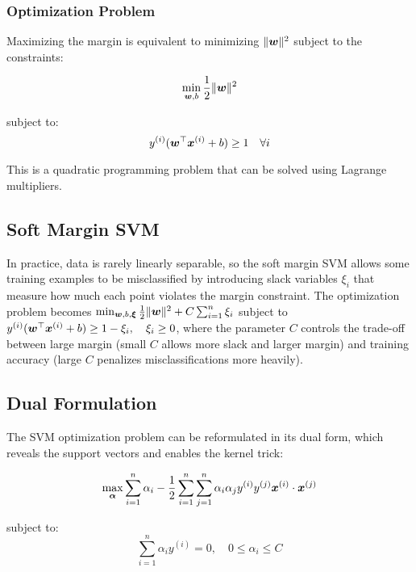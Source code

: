 \subsubsection{Optimization Problem}

Maximizing the margin is equivalent to minimizing $\|\boldsymbol{w}\|^2$ subject to the constraints:

\begin{equation}
\min_{\boldsymbol{w}, b} \frac{1}{2}\|\boldsymbol{w}\|^2
\end{equation}

subject to:
\begin{equation}
y^{(i)}(\boldsymbol{w}^\top \boldsymbol{x}^{(i)} + b) \geq 1 \quad \forall i
\end{equation}

This is a quadratic programming problem that can be solved using Lagrange multipliers.

\subsection{Soft Margin SVM}

In practice, data is rarely linearly separable, so the soft margin SVM allows some training examples to be misclassified by introducing slack variables $\xi_i$ that measure how much each point violates the margin constraint. The optimization problem becomes $\min_{\boldsymbol{w}, b, \boldsymbol{\xi}} \frac{1}{2}\|\boldsymbol{w}\|^2 + C \sum_{i=1}^{n} \xi_i$ subject to $y^{(i)}(\boldsymbol{w}^\top \boldsymbol{x}^{(i)} + b) \geq 1 - \xi_i, \quad \xi_i \geq 0$, where the parameter $C$ controls the trade-off between large margin (small $C$ allows more slack and larger margin) and training accuracy (large $C$ penalizes misclassifications more heavily).

\subsection{Dual Formulation}

The SVM optimization problem can be reformulated in its dual form, which reveals the support vectors and enables the kernel trick:

\begin{equation}
\max_{\boldsymbol{\alpha}} \sum_{i=1}^{n} \alpha_i - \frac{1}{2} \sum_{i=1}^{n} \sum_{j=1}^{n} \alpha_i \alpha_j y^{(i)} y^{(j)} \boldsymbol{x}^{(i)} \cdot \boldsymbol{x}^{(j)}
\end{equation}

subject to:
\begin{equation}
\sum_{i=1}^{n} \alpha_i y^{(i)} = 0, \quad 0 \leq \alpha_i \leq C
\end{equation}

